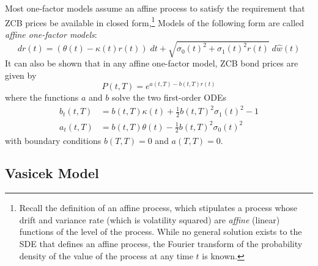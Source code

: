 \documentclass[a4paper,12pt]{scrartcl}
\begin{document}
Most one-factor models assume an affine process to satisfy the 
requirement that ZCB prices be available in closed form,\footnote{Recall
the definition of an affine process, which stipulates a process whose
drift and variance rate (which is volatility squared) are 
\emph{affine} (linear) functions of the level of the process. While no
general solution exists to the SDE that defines an affine process, 
the Fourier transform of the probability density of the value of the
process at any time $t$ is known.} Models of the following form
are called \emph{affine one-factor models}:
\begin{equation}
   \label{affine}
   dr(t) = \left( \theta(t) - \kappa(t) r(t)\right) \; dt + 
      \sqrt{ \sigma_0(t)^2 + \sigma_1(t)^2 r(t) } \; d\hat{w}(t) 
\end{equation}
It can also be shown that in any affine one-factor model, ZCB bond
prices are given by
\begin{equation}
   \label{affinep}
   P(t,T) = e^{a(t,T)-b(t,T)r(t)} 
\end{equation}
where the functions $a$ and $b$ solve the two first-order ODEs
\begin{align*}
    b_t(t,T) &= b(t,T) \kappa(t) + \frac{1}{2} b(t,T)^2 \sigma_1(t)^2-1 
      \\
   a_t(t,T) &= b(t,T) \theta(t) - \frac{1}{2} b(t,T)^2 \sigma_0(t)^2
\end{align*}
with boundary conditions $b(T,T)=0$ and $a(T,T)=0$. 

\subsection{Vasicek Model}
\end{document}
